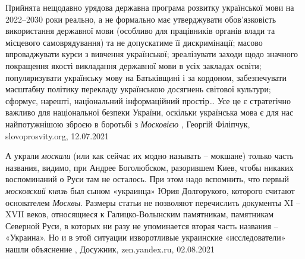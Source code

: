 Прийнята нещодавно урядова державна програма розвитку української мови на
2022–2030 роки реально, а не формально має утверджувати обов’язковість
використання державної мови (особливо для працівників органів влади та
місцевого самоврядування) та не допускатиме її дискримінації; масово
впроваджувати курси з вивчення української; зреалізувати заходи щодо значного
покращення якості викладання державної мови в усіх закладах освіти;
популяризувати українську мову на Батьківщині і за кордоном, забезпечувати
масштабну політику перекладу українською досягнень світової культури; сформує,
нарешті, національний інформаційний простір… Усе це є стратегічно важливо для
національної безпеки України, оскільки українська мова є для нас найпотужнішою
зброєю в боротьбі з \emph{Московією}
, Георгій Філіпчук, slovoprosvity.org, 12.07.2021

А украли \emph{москали} (или как сейчас их модно называть – мокшане) только часть
названия, видимо, при Андрее Боголюбском, разорившем Киев, чтобы никаких
воспоминаний о Руси там не осталось. При этом надо вспомнить, что первый
\emph{московский князь} был сыном «украинца» Юрия Долгорукого, которого считают
основателем \emph{Москвы}.  Размеры статьи не позволяют перечислить документы XI –
XVII веков, относящиеся к Галицко-Волынским памятникам, памятникам Северной
Руси, в которых ни разу не упоминается вторая часть названия – «Украина». Но и
в этой ситуации изворотливые украинские «исследователи» нашли объяснение
, Досужник, zen.yandex.ru, 02.08.2021

